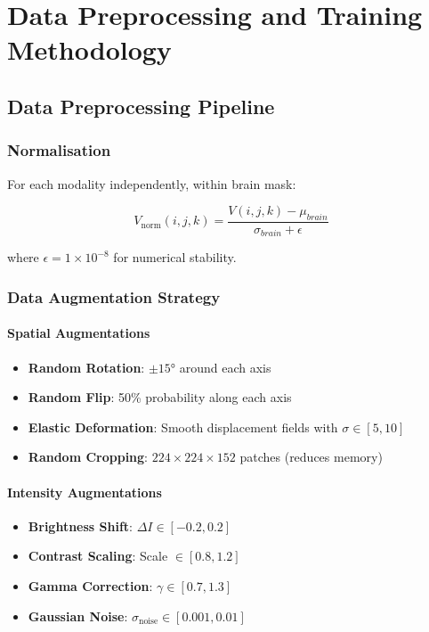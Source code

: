 \documentclass{ecsproject}     %
\begin{document}
\chapter{Data Preprocessing and Training Methodology} \label{Chapter:Training}

\section{Data Preprocessing Pipeline}

\subsection{Normalisation}

For each modality independently, within brain mask:

\begin{equation}
V_{\text{norm}}(i,j,k) = \frac{V(i,j,k) - \mu_{brain}}{\sigma_{brain} + \epsilon}
\end{equation}

where $\epsilon = 1 \times 10^{-8}$ for numerical stability.

\subsection{Data Augmentation Strategy}

\subsubsection{Spatial Augmentations}

\begin{itemize}
    \item \textbf{Random Rotation}: $\pm 15°$ around each axis
    \item \textbf{Random Flip}: 50\% probability along each axis
    \item \textbf{Elastic Deformation}: Smooth displacement fields with $\sigma \in [5, 10]$
    \item \textbf{Random Cropping}: $224 \times 224 \times 152$ patches (reduces memory)
\end{itemize}

\subsubsection{Intensity Augmentations}

\begin{itemize}
    \item \textbf{Brightness Shift}: $\Delta I \in [-0.2, 0.2]$
    \item \textbf{Contrast Scaling}: Scale $\in [0.8, 1.2]$
    \item \textbf{Gamma Correction}: $\gamma \in [0.7, 1.3]$
    \item \textbf{Gaussian Noise}: $\sigma_{\text{noise}} \in [0.001, 0.01]$
\end{itemize}
\end{document}
